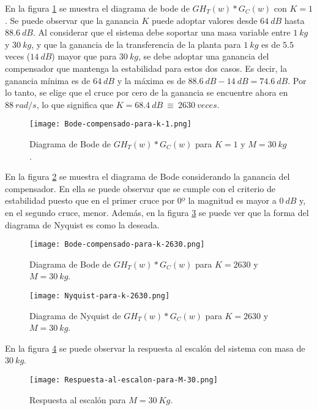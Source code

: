 \noindent En la figura \ref{fig:bode-compensado-para-k-1} se muestra el diagrama de bode de ${GH}_T(w)*G_C(w)$ con $K=1$. Se puede observar que la ganancia $K$ puede adoptar valores desde $64\:dB$ hasta $88.6\:dB$. Al considerar que el sistema debe soportar una masa variable entre $1\:kg$ y $30\:kg$, y que la ganancia de la transferencia de la planta para $1\:kg$ es de $5.5$ veces ($14\:dB$) mayor que para $30\:kg$, se debe adoptar una ganancia del compensador que mantenga la estabilidad para estos dos casos. Es decir, la ganancia m\'{i}nima es de $64\:dB$ y la m\'{a}xima es de $88.6\:dB - 14\:dB = 74.6\:dB$. Por lo tanto, se elige que el cruce por cero de la ganancia se encuentre ahora en $88\:rad/s$, lo que significa que $K=68.4\:dB\ \equiv \ 2630\:veces$.


\begin{figure}[H]
	\centering
	\texttt{[image: Bode-compensado-para-k-1.png]}
	\caption{Diagrama de Bode de $GH_T(w)*G_C(w)$ para $K=1$ y $M=30\:kg$.}
	\label{fig:bode-compensado-para-k-1}
\end{figure}


\noindent En la figura \ref{fig:bode-compensado-para-k-2630} se muestra el diagrama de Bode considerando la ganancia del compensador. En ella se puede observar que se  cumple con el criterio de estabilidad puesto que en el primer cruce por 0º la magnitud es mayor a $0\:dB$ y, en el segundo cruce, menor. Adem\'{a}s, en la figura \ref{fig:nyquist-para-k-2630} se puede ver que la forma del diagrama de Nyquist es como la deseada.

\begin{figure}[H]
	\centering
	\texttt{[image: Bode-compensado-para-k-2630.png]}
	\caption{Diagrama de Bode de $GH_T(w)*G_C(w)$ para $K=2630$ y $M=30\:kg$.}
	\label{fig:bode-compensado-para-k-2630}
\end{figure}

\begin{figure}[H]
	\centering
	\texttt{[image: Nyquist-para-k-2630.png]}
	\caption{Diagrama de Nyquist de $GH_T(w)*G_C(w)$ para $K=2630$ y $M=30\:kg$.}
	\label{fig:nyquist-para-k-2630}
\end{figure}

\noindent En la figura \ref{fig:respuesta-al-escalon-para-M-30} se puede observar la respuesta al escal\'{o}n del sistema con masa de $30\:kg$.


\begin{figure}[H]
	\centering
	\texttt{[image: Respuesta-al-escalon-para-M-30.png]}
	\caption{Respuesta al escalón para $M=30\:Kg$.}
	\label{fig:respuesta-al-escalon-para-M-30}
\end{figure}


